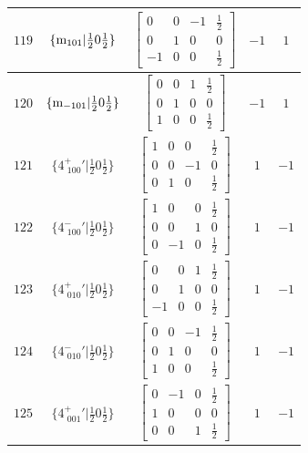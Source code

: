 \documentclass[fleqn,8pt]{jsarticle}
\begin{document}
\begin{longtable}{ccccc}
$ 119 $ & $ \{{\rm m}_{101}|\frac{1}{2} 0 \frac{1}{2}\} $ & $ \begin{bmatrix} 0 & 0 & -1 & \frac{1}{2} \\ 0 & 1 & 0 & 0 \\ -1 & 0 & 0 & \frac{1}{2} \end{bmatrix} $ & $ -1 $ & $ 1 $ \\ \hline
$ 120 $ & $ \{{\rm m}_{-101}|\frac{1}{2} 0 \frac{1}{2}\} $ & $ \begin{bmatrix} 0 & 0 & 1 & \frac{1}{2} \\ 0 & 1 & 0 & 0 \\ 1 & 0 & 0 & \frac{1}{2} \end{bmatrix} $ & $ -1 $ & $ 1 $ \\ \hline
$ 121 $ & $ \{4^{+}_{\,\,100}{}'|\frac{1}{2} 0 \frac{1}{2}\} $ & $ \begin{bmatrix} 1 & 0 & 0 & \frac{1}{2} \\ 0 & 0 & -1 & 0 \\ 0 & 1 & 0 & \frac{1}{2} \end{bmatrix} $ & $ 1 $ & $ -1 $ \\ \hline
$ 122 $ & $ \{4^{-}_{\,\,100}{}'|\frac{1}{2} 0 \frac{1}{2}\} $ & $ \begin{bmatrix} 1 & 0 & 0 & \frac{1}{2} \\ 0 & 0 & 1 & 0 \\ 0 & -1 & 0 & \frac{1}{2} \end{bmatrix} $ & $ 1 $ & $ -1 $ \\ \hline
$ 123 $ & $ \{4^{+}_{\,\,010}{}'|\frac{1}{2} 0 \frac{1}{2}\} $ & $ \begin{bmatrix} 0 & 0 & 1 & \frac{1}{2} \\ 0 & 1 & 0 & 0 \\ -1 & 0 & 0 & \frac{1}{2} \end{bmatrix} $ & $ 1 $ & $ -1 $ \\ \hline
$ 124 $ & $ \{4^{-}_{\,\,010}{}'|\frac{1}{2} 0 \frac{1}{2}\} $ & $ \begin{bmatrix} 0 & 0 & -1 & \frac{1}{2} \\ 0 & 1 & 0 & 0 \\ 1 & 0 & 0 & \frac{1}{2} \end{bmatrix} $ & $ 1 $ & $ -1 $ \\ \hline
$ 125 $ & $ \{4^{+}_{\,\,001}{}'|\frac{1}{2} 0 \frac{1}{2}\} $ & $ \begin{bmatrix} 0 & -1 & 0 & \frac{1}{2} \\ 1 & 0 & 0 & 0 \\ 0 & 0 & 1 & \frac{1}{2} \end{bmatrix} $ & $ 1 $ & $ -1 $ \\ \hline

\end{longtable}
\end{document}
